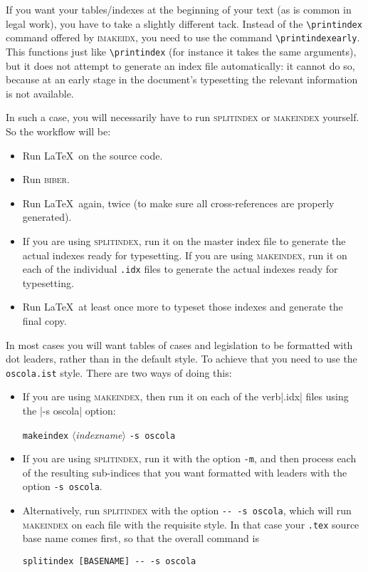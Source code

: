 \documentclass[a4paper,
               11pt,
	       DIV=1,			   
	       footinclude=false]
	      {scrartcl}
\newcommand\angledtext[1]{$\langle$\textit{#1}\/$\rangle$}
\begin{document}
If you want your tables\slash indexes at the beginning of your text
(as is common in legal work), you have to take a slightly different
tack. Instead of the \verb|\printindex| command offered by
\textsc{imakeidx}, you need to use the command
\verb|\printindexearly|. This functions just like \verb|\printindex|
(for instance it takes the same arguments), but it does not attempt to
generate an index file automatically: it cannot do so, because at an
early stage in the document's typesetting the relevant information is
not available.

In such a case, you will necessarily have to run \textsc{splitindex}
or \textsc{makeindex} yourself. So the workflow will be:
\begin{itemize}
\item Run \LaTeX\ on the source code.
\item Run \textsc{biber}.
\item Run \LaTeX\ again, twice (to make sure all cross-references are properly generated).
\item If you are using \textsc{splitindex}, run it on the master index
  file to generate the actual indexes ready for typesetting. If you
  are using \textsc{makeindex}, run it on each of the individual
  \texttt{.idx} files to generate the actual indexes ready for typesetting.
\item Run \LaTeX\ at least once more to typeset those indexes and
  generate the final copy.
\end{itemize}

In most cases you will want tables of cases and legislation to be
formatted with dot leaders, rather than in the default style. To
achieve that you need to use the \verb|oscola.ist| style. There are
two ways of doing this:
\begin{itemize}
\item If you are using \textsc{makeindex}, then run it on each of the verb|.idx| files using the |-s oscola| option:
\begin{center}
  \texttt{makeindex} \angledtext{indexname} \texttt{-s oscola}
\end{center}
\item If you are using \textsc{splitindex}, run it with the option
  \verb|-m|, and then process each of the resulting sub-indices that
  you want formatted with leaders with the option \verb|-s oscola|.
\item Alternatively, run \textsc{splitindex} with the option \verb|-- -s oscola|, which will run \textsc{makeindex} on each file with the requisite style. In that case your \verb|.tex| source base name comes first, so that the overall command is
\begin{verbatim}
splitindex [BASENAME] -- -s oscola
\end{verbatim}
\end{itemize}
\end{document}
